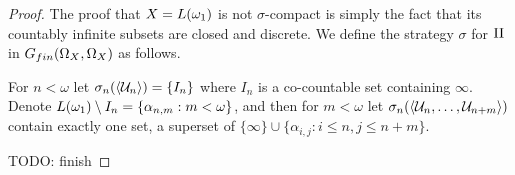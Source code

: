 \documentclass{amsart}
\theoremstyle{plain}
\theoremstyle{definition}
\theoremstyle{remark}
\theoremstyle{plain}
\theoremstyle{definition}
\theoremstyle{remark}
\begin{document}
\begin{proof}
  The proof that \(X=L(\omega_1)\) is not
  \(\sigma\)-compact is simply the fact that its countably infinite subsets
  are closed and discrete.
  We define the strategy \(\sigma\) for \(\mathrm{II}\) in
  \(G_{fin}(\Omega_X,\Omega_X)\) as follows.


  For \(n<\omega\)
  let \(\sigma_n(\langle\mathcal{U}_n\rangle)=\{I_n\}\)
  where \(I_n\) is a co-countable set containing \(\infty\).
  Denote
  \(L(\omega_1)\setminus I_n=\{\alpha_{n,m}:m<\omega\}\),
  and then for \(m<\omega\)
  let \(\sigma_n(\langle\mathcal{U}_n,\dots,\mathcal{U}_{n+m}\rangle)\) contain exactly
  one set, a superset of \(\{\infty\}\cup\{\alpha_{i,j}:i\leq n,j\leq n+m\}\).

  TODO: finish
\end{proof}




\end{document}
